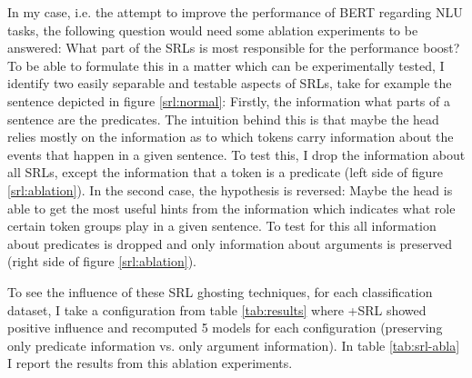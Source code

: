 {In my case, i.e. the attempt to improve the performance of BERT regarding NLU tasks, the
following question would need some ablation experiments to be answered: What part of the SRLs
is most responsible for the performance boost? To be able to formulate this in a matter which
can be experimentally tested, I identify two easily separable and testable aspects of SRLs,
take for example the sentence depicted in figure \ref{srl:normal}: Firstly, the information
what parts of a sentence are the predicates. The intuition behind this is that maybe the
head relies mostly on the information as to which tokens carry information about the events
that happen in a given sentence. To test this, I drop the information about all SRLs,
except the information that a token is a predicate (left side of figure \ref{srl:ablation}).
In the second case, the hypothesis is reversed: Maybe the head is able to get the most useful
hints from the information which indicates what role certain token groups play in a given
sentence. To test for this all information about predicates is dropped and only information
about arguments is preserved (right side of figure \ref{srl:ablation}).

To see the influence of these SRL ghosting techniques, for each classification dataset, I take a
configuration from table \ref{tab:results} where +SRL showed positive influence and recomputed 5
models for each configuration (preserving only predicate information vs. only argument information).
In table \ref{tab:srl-abla} I report the results from this ablation experiments.


}

